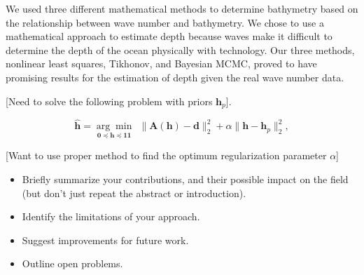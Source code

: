 We used three different mathematical methods to determine bathymetry based on the relationship between wave number and bathymetry. We chose to use a mathematical approach to estimate depth because waves make it difficult to determine the depth of the ocean physically with technology. Our three methods, nonlinear least squares, Tikhonov, and Bayesian MCMC, proved to have promising results for the estimation of depth given the real wave number data. 


[Need to solve the following problem with priors $\mathbf{h}_p$].

\begin{equation}\label{LS-regBC}
\mathbf{\hat{h}} = \underset{\mathbf{0} \preceq \mathbf{h} \preceq \mathbf{11}}{\arg \min} \ \ \|  \mathbf{A}(\mathbf{h}) -  \mathbf{d} \|_2^2  +  \alpha \| \mathbf{h} -  \mathbf{h}_p\|_2^2,
\end{equation}

[Want to use proper method to find the optimum regularization parameter $\alpha$]

\begin{itemize}
\item Briefly summarize your contributions, and their possible
impact on the field (but don't just repeat the abstract or introduction).
\item Identify the limitations of your approach.
\item Suggest improvements for future work.
\item Outline open problems.
\end{itemize}

